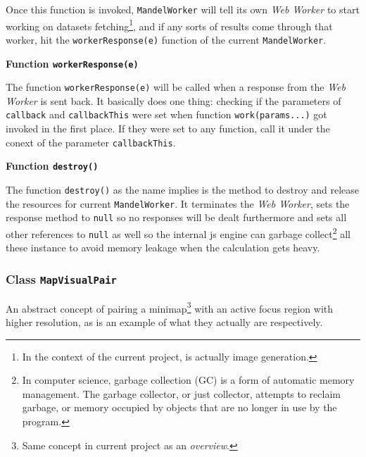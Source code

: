Once this function is invoked, \texttt{MandelWorker} will tell its own \emph{Web Worker} to start working on datasets fetching\footnote{ In the context of the current project, is actually image generation. }, and if any sorts of results come through that worker, hit the \texttt{workerResponse(e)} function of the current \texttt{MandelWorker}.

\textbf{Function \texttt{workerResponse(e)}}

The function \texttt{workerResponse(e)} will be called when a response from the \emph{Web Worker} is sent back. It basically does one thing: checking if the parameters of \texttt{callback} and \texttt{callbackThis} were set when function \texttt{work(params...)} got invoked in the first place. If they were set to any function, call it under the conext of the parameter \texttt{callbackThis}.

\textbf{Function \texttt{destroy()}}

The function \texttt{destroy()} as the name implies is the method to destroy and release the resources for current \texttt{MandelWorker}. It terminates the \emph{Web Worker}, sets the response method to \texttt{null} so no responses will be dealt furthermore and sets all other references to \texttt{null} as well so the internal \gls{js} engine can garbage collect\footnote{ In computer science, garbage collection (GC) is a form of automatic memory management. The garbage collector, or just collector, attempts to reclaim garbage, or memory occupied by objects that are no longer in use by the program\cite{wiki:gc}.} all these instance to avoid memory leakage when the calculation gets heavy.

\subsubsection{Class \texttt{MapVisualPair}}

An abstract concept of pairing a minimap\footnote{ Same concept in current project as an \emph{overview}. } with an active focus region with higher resolution, as  is an example of what they actually are respectively.

